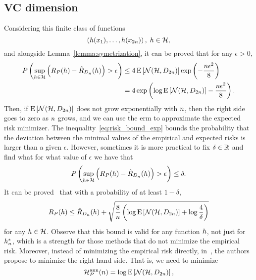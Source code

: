 \subsection{VC dimension}
%
Considering this finite class of functions
$$ \left(h(x_1), \ldots, h(x_{2 n})  \right), \; h \in \mathcal{H} ,$$
and alongside Lemma~\ref{lemma:symetrization}, it can be proved that for any $\epsilon > 0$,
\begin{equation}
    \label{eq:risk_bound_exp}
    \begin{aligned}
        P \left(\sup_{\hypf \in \hypspace} \left(\exprisk(\hypf) - \empriskn(\hypf) \right) > \epsilon \right) &\leq 4 \expect\left[\mathcal{N}(\hypspace, \sample_{2 \nsamples}) \right] \exp\left(- \frac{\nsamples \epsilon^2}{8} \right) \\
        &= 4 \exp\left(\log \expect\left[\mathcal{N}(\hypspace, \sample_{2 \nsamples}) \right] - \frac{\nsamples \epsilon^2}{8} \right) .
    \end{aligned}
\end{equation}
Then, if $\operatorname{E}\left[\mathcal{N}(\mathcal{H}, D_{2 n}) \right]$ does not grow exponentially with $n$, then the right side goes to zero as $n$ grows, and we can use the \acrshort{erm} to approximate the expected risk minimizer. 
%
%
The inequality~\eqref{eq:risk_bound_exp} bounds the probability that the deviation between the minimal values of the empirical and expected risks is larger than a given $\epsilon$. However, sometimes it is more practical to fix $\delta \in \mathbb{R}$ and find what for what value of $\epsilon$ we have that 
$$ P \left(\sup_{h \in \mathcal{H}} \left(R_P(h) - \hat{R}_{D_{n}}(h) \right) > \epsilon \right) \leq \delta .$$
It can be proved~\citep{vapnik1982estimation} that with a probability of at least $1 - \delta$, 
\begin{equation}
    \label{eq:risk_bound_ent}
    \exprisk(\hypf) \leq \empriskn(\hypf) + \sqrt{\frac{8}{\nsamples} \left(\log \expect\left[\mathcal{N}(\hypspace, \sample_{2 \nsamples})\right] + \log \frac{4}{\delta} \right)}
\end{equation}
for any $h \in \mathcal{H}$. Observe that this bound is valid for any function $h$, not just for ${h}^*_n$, which is a strength for those methods that do not minimize the empirical risk.
%
Moreover, instead of minimizing the empirical risk directly, in~\citet{Vapnik00}, the authors propose to minimize the right-hand side. That is, we need to minimize 
\begin{equation}
    \nonumber
    \mathcal{H}^{\text{ann}}_{P}(n) = \log \operatorname{E}\left[\mathcal{N}(\mathcal{H}, D_{2 n}) \right] ,
\end{equation}
